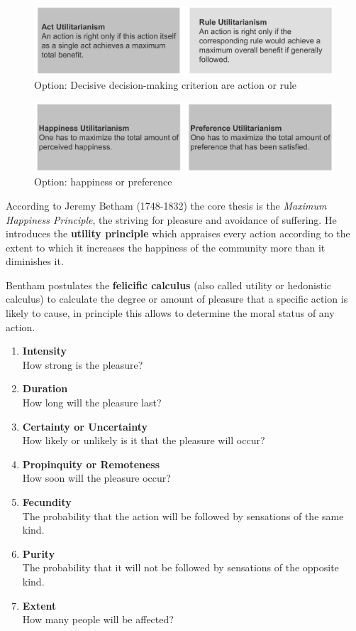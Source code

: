 \documentclass[11pt]{article}
\theoremstyle{definition}
\begin{document}
\begin{figure}[tbh]
	\centering
	\includegraphics[width=0.8\linewidth]{img/act-rule-utilitarianism}
	\caption{Option: Decisive decision-making criterion are action or rule}
	\label{fig:act-rule-utilitarianism}
\end{figure}

\begin{figure}[tbh]
	\centering
	\includegraphics[width=0.8\linewidth]{img/happiness-preference-utilitarianism}
	\caption{Option: happiness or preference}
	\label{fig:happiness-preference-utilitarianism}
\end{figure}

According to Jeremy Betham (1748-1832) the core thesis is the \textit{Maximum Happiness Principle}, the striving for pleasure and avoidance of suffering. He introduces the \textbf{utility principle} which appraises every action according to the extent to which it increases the happiness of the community more than it diminishes it.

\clearpage
Bentham postulates the \textbf{felicific calculus} (also called utility or hedonistic calculus) to calculate the degree or amount of pleasure that a specific action is likely to cause, in principle this allows to determine the moral status of any action.
\begin{enumerate}[nosep]
	\item \textbf{Intensity}\\
	How strong is the pleasure?
	\item \textbf{Duration}\\
	How long will the pleasure last?
	\item \textbf{Certainty or Uncertainty}\\
	How likely or unlikely is it that the pleasure will occur?
	\item \textbf{Propinquity or Remoteness}\\
	How soon will the pleasure occur?
	\item \textbf{Fecundity}\\
	The probability that the action will be followed by sensations of the same kind.
	\item \textbf{Purity}\\
	The probability that it will not be followed by sensations of the opposite kind.
	\item \textbf{Extent}\\
	How many people will be affected?
\end{enumerate}
\end{document}
